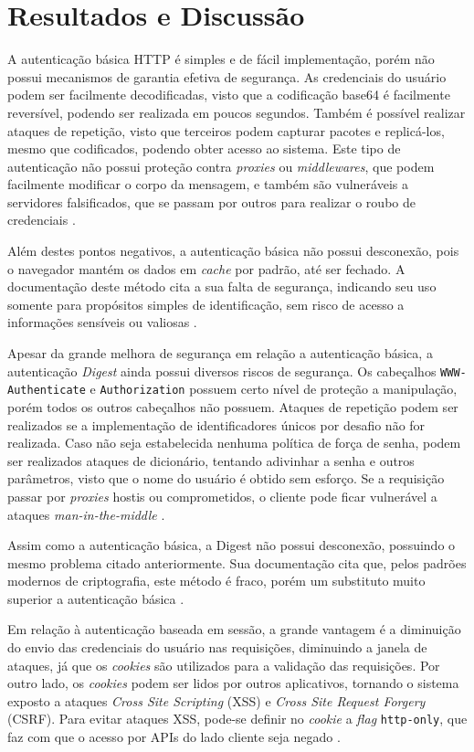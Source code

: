 \section{Resultados e Discussão}

A autenticação básica HTTP é simples e de fácil implementação, porém não possui mecanismos de 
garantia efetiva de segurança. As credenciais do usuário podem ser facilmente decodificadas, visto 
que a codificação base64 é facilmente reversível, podendo ser realizada em poucos segundos. Também 
é possível realizar ataques de repetição, visto que terceiros podem capturar pacotes e replicá-los, 
mesmo que codificados, podendo obter acesso ao sistema. Este tipo de autenticação não possui proteção 
contra \emph{proxies} ou \emph{middlewares}, que podem facilmente modificar o corpo da mensagem, e 
também são vulneráveis a servidores falsificados, que se passam por outros para realizar o roubo de 
credenciais \cite{GOURLEY2002}.

Além destes pontos negativos, a autenticação básica não possui desconexão, pois o navegador mantém 
os dados em \emph{cache} por padrão, até ser fechado. A documentação deste método cita a sua falta 
de segurança, indicando seu uso somente para propósitos simples de identificação, sem risco de 
acesso a informações sensíveis ou valiosas \cite{RFC7617}. 

Apesar da grande melhora de segurança em relação a autenticação básica, a autenticação 
\emph{Digest} ainda possui diversos riscos de segurança. Os cabeçalhos 
\texttt{WWW-Authenticate} e \texttt{Authorization} possuem certo nível de proteção a manipulação, 
porém todos os outros cabeçalhos não possuem. Ataques de repetição podem ser realizados se a 
implementação de identificadores únicos por desafio não for realizada. Caso não seja estabelecida 
nenhuma política de força de senha, podem ser realizados ataques de dicionário, tentando adivinhar 
a senha e outros parâmetros, visto que o nome do usuário é obtido sem esforço. Se a requisição 
passar por \emph{proxies} hostis ou comprometidos, o cliente pode ficar vulnerável a ataques 
\emph{man-in-the-middle} \cite{GOURLEY2002}. 

Assim como a autenticação básica, a Digest não possui desconexão, possuindo o mesmo problema citado
anteriormente. Sua documentação cita que, pelos padrões modernos de criptografia, este método 
é fraco, porém um substituto muito superior a autenticação básica \cite{RFC7616}.

Em relação à autenticação baseada em sessão, a grande vantagem é a diminuição do envio das 
credenciais do usuário nas requisições, diminuindo a janela de ataques, já que os \emph{cookies} 
são utilizados para a validação das requisições. Por outro lado, os \emph{cookies} podem ser lidos por 
outros aplicativos, tornando o sistema exposto a ataques \emph{Cross Site Scripting} (XSS) e 
\emph{Cross Site Request Forgery} (CSRF). Para evitar ataques XSS, pode-se definir no \emph{cookie} 
a \emph{flag} \texttt{http-only}, que faz com que o acesso por APIs do lado cliente seja negado 
\cite{PAPATHANASAKI2022}. 

